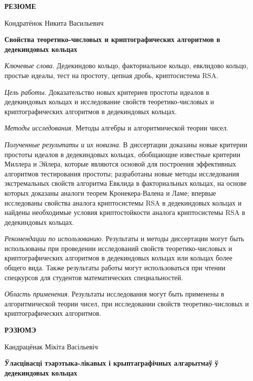 \documentclass[_00_autoref.tex]{subfiles}
\begin{document}
\newpage
\centerline{\textbf{РЕЗЮМЕ}}

\vspace{-0.3ex}
\begin{center}
Кондратёнок Никита Васильевич

\textbf{Свойства теоретико-числовых и криптографических алгоритмов в дедекиндовых кольцах}
\end{center}
\vspace{-0.3ex}

\textit{Ключевые слова}.
Дедекиндово кольцо, факториальное кольцо, евклидово кольцо, простые идеалы, тест на простоту, цепная дробь, криптосистема RSA.

\textit{Цель работы}.
Доказательство новых критериев простоты идеалов в дедекиндовых кольцах и исследование свойств теоретико-числовых и криптографических алгоритмов в дедекиндовых кольцах.

\textit{Методы исследования}.
Методы алгебры и алгоритмической теории чисел.

\textit{Полученные результаты и их новизна}.
В диссертации доказаны новые критерии простоты идеалов в дедекиндовых кольцах, обобщающие известные критерии Миллера и Эйлера, которые являются основой для построения эффективных алгоритмов тестирования простоты; разработаны новые методы исследования экстремальных свойств алгоритма Евклида в факториальных кольцах, на основе которых доказаны аналоги теорем Кронекера-Валена и Ламе; впервые исследованы свойства аналога криптосистемы RSA в дедекиндовых кольцах и найдены необходимые условия криптостойкости аналога криптосистемы RSA в дедекиндовых кольцах.

\textit{Рекомендации по использованию}.
Результаты и методы диссертации могут быть использованы при проведении исследований свойств теоретико-числовых и криптографических алгоритмов в дедекиндовых кольцах или кольцах более общего вида.
Также результаты работы могут использоваться при чтении спецкурсов для студентов математических специальностей.

\textit{Область применения}.
Результаты исследования могут быть применены в алгоритмической теории чисел, при исследовании свойств теоретико-числовых и криптографических алгоритмов.

\newpage
\centerline{\textbf{РЭЗЮМЭ}}

\vspace{-0.3ex}
\begin{center}
Кандрацёнак Мікіта Васільевіч

\textbf{Ўласцівасці тэарэтыка-лікавых і крыптаграфічных алгарытмаў ў дедекиндовых кольцах}
\end{center}
\vspace{-0.3ex}
\end{document}
